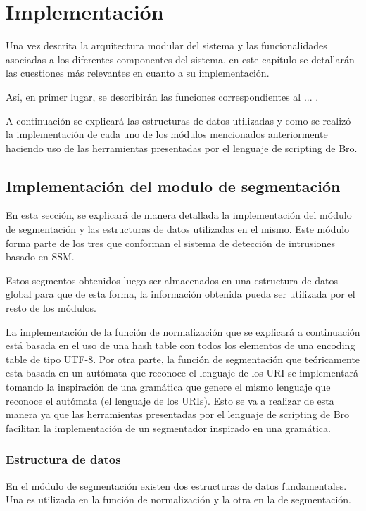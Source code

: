 \chapter{Implementación}

Una vez descrita la arquitectura modular del sistema y las funcionalidades asociadas a los diferentes componentes del sistema, en este capítulo se detallarán las cuestiones más relevantes en cuanto a su implementación.

Así, en primer lugar, se describirán las funciones correspondientes al ... .

A continuación se explicará las estructuras de datos utilizadas y como se realizó la implementación de cada uno de los módulos mencionados anteriormente haciendo uso de las herramientas presentadas por el lenguaje de scripting de Bro.

\label{capitulo4}
\section{Implementación del modulo de segmentación}

En esta sección, se explicará de manera detallada la implementación del módulo de segmentación y las estructuras de datos utilizadas en el mismo. Este módulo forma parte de los tres que conforman el sistema de detección de intrusiones basado en SSM. 

Estos segmentos obtenidos luego ser almacenados en una estructura de datos global para que de esta forma, la información obtenida pueda ser utilizada por el resto de los módulos.

La implementación de la función de normalización que se explicará a continuación está basada en el uso de una hash table con todos los elementos de una encoding table de tipo UTF-8. Por otra parte, la función de segmentación que teóricamente esta basada en un autómata que reconoce el lenguaje de los URI se implementará tomando la inspiración de una gramática que genere el mismo lenguaje que reconoce el autómata (el lenguaje de los URIs). Esto se va a realizar de esta manera ya que las herramientas presentadas por el lenguaje de scripting de Bro facilitan la implementación de un segmentador inspirado en una gramática.

\subsection{Estructura de datos}
En el módulo de segmentación existen dos estructuras de datos fundamentales. Una es utilizada en la función de normalización y la otra en la de segmentación.

